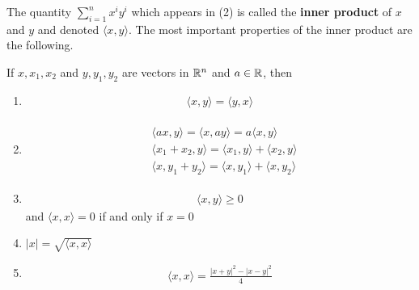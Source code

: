 The quantity $\sum_{i=1 }^{n }{x^iy^i}$ which appears in (2) is called the 
\textbf{inner product} of $x$ and $y$ and denoted $\langle x, y\rangle$.
The most important properties of the inner product are the following.


\begin{theorem}
    If $x, x_1, x_2$ and $y, y_1, y_2$ are vectors in $\mathbb{R}^n$ and 
    $a\in \mathbb{R}$, then 
    \begin{enumerate}[label={\upshape(\arabic*)}]
        \item {}
            \begin{align*}
                \langle x, y\rangle = \langle y, x\rangle
            \end{align*}
        \item {}
            \begin{align*}\begin{aligned}
                & \langle ax, y\rangle = \langle x, ay\rangle = a\langle x, y\rangle\\
                & \langle x_1+x_2, y\rangle = \langle x_1, y\rangle + \langle x_2, y\rangle \\
                & \langle x, y_1+y_2\rangle = \langle x, y_1\rangle + \langle x, y_2\rangle
            \end{aligned}\end{align*}
        \item {}
            \begin{align*}
                \langle x, y\rangle\ge 0
            \end{align*}    
            and $\langle x, x\rangle = 0$ if and only if $x=0$
        \item $|x| = \sqrt{\langle x, x\rangle}$
        \item {}
            \begin{align*}
              \langle x, x\rangle = \frac{|x+y|^2 - |x-y|^2}{4}
            \end{align*}
    \end{enumerate} 
\end{theorem}

